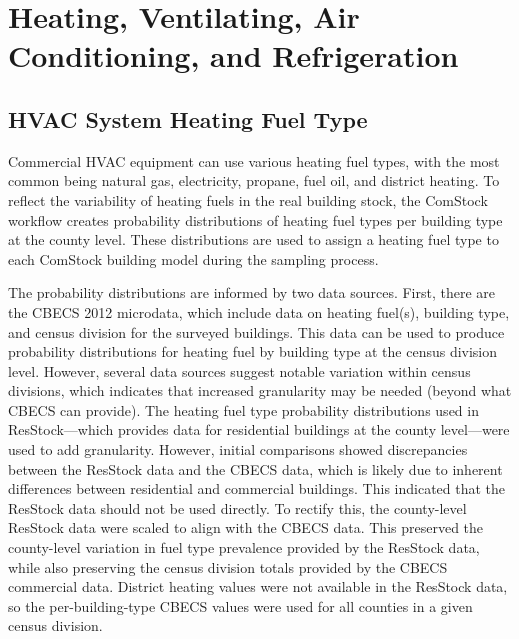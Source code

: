 \section{Heating, Ventilating, Air Conditioning, and Refrigeration}
\label{sec:HVAC_System_Type_Heating_Fuel_Type}

\subsection{HVAC System Heating Fuel Type}

Commercial HVAC equipment can use various heating fuel types, with the most common being natural gas, electricity, propane, fuel oil, and district heating. To reflect the variability of heating fuels in the real building stock, the ComStock workflow creates probability distributions of heating fuel types per building type at the county level. These distributions are used to assign a heating fuel type to each ComStock building model during the sampling process.

The probability distributions are informed by two data sources. First, there are the CBECS 2012 microdata, which include data on heating fuel(s), building type, and census division for the surveyed buildings. This data can be used to produce probability distributions for heating fuel by building type at the census division level. However, several data sources suggest notable variation within census divisions, which indicates that increased granularity may be needed (beyond what CBECS can provide). The heating fuel type probability distributions used in ResStock---which provides data for residential buildings at the county level---were used to add granularity. However, initial comparisons showed discrepancies between the ResStock data and the CBECS data, which is likely due to inherent differences between residential and commercial buildings. This indicated that the ResStock data should not be used directly. To rectify this, the county-level ResStock data were scaled to align with the CBECS data. This preserved the county-level variation in fuel type prevalence provided by the ResStock data, while also preserving the census division totals provided by the CBECS commercial data. District heating values were not available in the ResStock data, so the per-building-type CBECS values were used for all counties in a given census division. 

